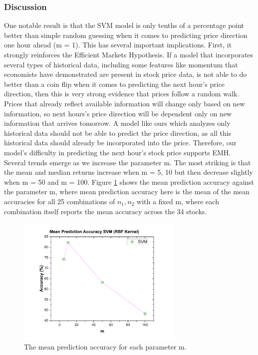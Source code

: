 \usepackage{fancyhdr}\documentclass[conference]{IEEEtran}
\begin{document}
\subsubsection{Discussion}
One notable result is that the SVM model is only tenths of a percentage point better than simple random guessing when it comes to predicting price direction one hour ahead (m = 1). This has several important implications. First, it strongly reinforces the Efficient Markets Hypothesis. If a model that incorporates several types of historical data, including some features like momentum that economists have demonstrated are present in stock price data, is not able to do better than a coin flip when it comes to predicting the next hour’s price direction, then this is very strong evidence that prices follow a random walk. Prices that already reflect available information will change only based on new information, so next hours’s price direction will be dependent only on new information that arrives tomorrow. A model like ours which analyzes only historical data should not be able to predict the price direction, as all this historical data should already be incorporated into the price. Therefore, our model’s difficulty in predicting the next hour’s stock price supports EMH.
\\
Several trends emerge as we increase the parameter m. The most striking is that the mean and median returns increase when m = 5, 10 but then decrease slightly when m = 50 and m = 100. Figure \ref{fig:SVM} shows the mean prediction accuracy against the parameter m, where mean prediction accuracy here is the mean of the mean accuracies for all 25 combinations of $n_1,n_2$ with a fixed m, where each combination itself reports the mean accuracy across the 34 stocks.
\begin{figure}[t]\label{fig:SVM}
\includegraphics[width=8cm]{SVM_1.pdf}
\centering
\caption{The mean prediction accuracy for each parameter m.}
\end{figure}
\end{document}
